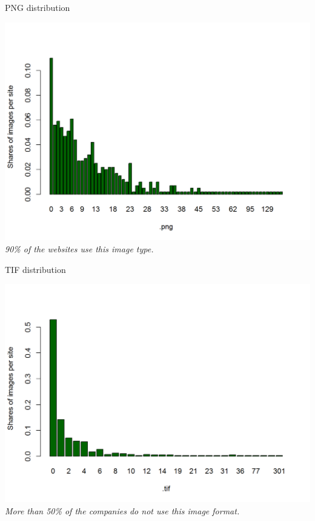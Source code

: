 \documentclass{book}
\begin{document}
\begin{table}[H]
\centering
\caption{PNG distribution}
\begin{center}
\includegraphics[scale=0.4]{../R/photos/60_png_dist.png}    \\
\textit{90\% of the websites use this image type.}
\end{center}
\end{table}
\begin{table}[H]
\centering
\caption{TIF distribution}
\begin{center}
\includegraphics[scale=0.4]{../R/photos/61_tif_dist.png}    \\
\textit{More than 50\% of the companies do not use this image format.}
\end{center}
\end{table}
\end{document}
